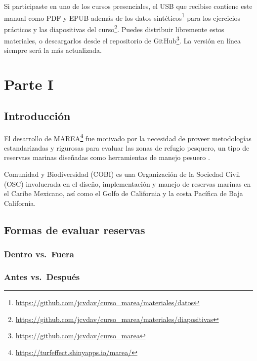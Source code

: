 \documentclass[]{krantz}
\renewcommand{\href}[2]{#2\footnote{\url{#1}}}
\begin{document}
Si participaste en uno de los cursos presenciales, el USB que recibise
contiene este manual como PDF y EPUB además de los
\href{https://github.com/jcvdav/curso_marea/materiales/datos}{datos
sintéticos} para los ejercicios prácticos y las
\href{https://github.com/jcvdav/curso_marea/materiales/diapositivas}{diapositivas
del curso}. Puedes distribuir libremente estos materiales, o
descargarlos desde el
\href{https://github.com/jcvdav/curso_marea}{repositorio de GitHub}. La
versión en línea siempre será la más actualizada.

\clearpage

\hypertarget{part-parte-i}{%
\part{Parte I}\label{part-parte-i}}

\hypertarget{introduccion}{%
\chapter{Introducción}\label{introduccion}}

El desarrollo de \href{https://turfeffect.shinyapps.io/marea/}{MAREA}
fue motivado por la necesidad de proveer metodologías estandarizadas y
rigurosas para evaluar las zonas de refugio pesquero, un tipo de
reservass marinas diseñadas como herramientas de manejo pesuero
\citep{nom}.

Comunidad y Biodiversidad (COBI) es una Organización de la Sociedad
Civil (OSC) involucrada en el diseño, implementación y manejo de
reservas marinas en el Caribe Mexicano, así como el Golfo de California
y la costa Pacífica de Baja California.

\hypertarget{formas-de-evaluar-reservas}{%
\chapter{Formas de evaluar reservas}\label{formas-de-evaluar-reservas}}

\hypertarget{dentro-vs.fuera}{%
\section{Dentro vs.~Fuera}\label{dentro-vs.fuera}}

\hypertarget{antes-vs.despues}{%
\section{Antes vs.~Después}\label{antes-vs.despues}}
\end{document}
